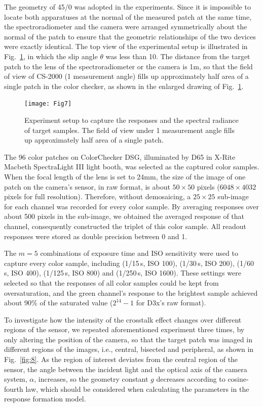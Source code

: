 \documentclass[9pt,twocolumn,twoside]{osajnl}
\begin{document}
The geometry of 45\textdegree{}/0\textdegree{} was adopted in the experiments. Since it is impossible to locate both apparatuses at the normal of the measured patch at the same time, the spectroradiometer and the camera were arranged symmetrically about the normal of the patch to ensure that the geometric relationships of the two devices were exactly identical. The top view of the experimental setup is illustrated in Fig.~\ref{fig:7}, in which the slip angle $\theta$ was less than 10\textdegree. The distance from the target patch to the lens of the spectroradiometer or the camera is 1m, so that the field of view of CS-2000 (1\textdegree{} measurement angle) fills up approximately half area of a single patch in the color checker, as shown in the enlarged drawing of Fig.~\ref{fig:7}. 

\begin{figure}[tbp]
	\centering
	\texttt{[image: Fig7]}
	\caption{Experiment setup to capture the responses and the spectral radiance of target samples. The field of view under 1\textdegree{} measurement angle fills up approximately half area of a single patch.}
	\label{fig:7}
\end{figure}

The 96 color patches on ColorChecker DSG, illuminated by D65 in X-Rite Macbeth SpectraLight III light booth, was selected as the captured color samples. When the focal length of the lens is set to 24mm, the size of the image of one patch on the camera’s sensor, in raw format, is about $50\times50$ pixels ($6048\times4032$ pixels for full resolution). Therefore, without demosaicing, a $25\times25$ sub-image for each channel was recorded for every color sample. By averaging responses over about 500 pixels in the sub-image, we obtained the averaged response of that channel, consequently constructed the triplet of this color sample. All readout responses were stored as double precision between 0 and 1.

The $m=5$ combinations of exposure time and ISO sensitivity were used to capture every color sample, including (1/15\,s, ISO 100), (1/30\,s, ISO 200), (1/60\,s, ISO 400), (1/125\,s, ISO 800) and (1/250\,s, ISO 1600). These settings were selected so that the responses of all color samples could be kept from oversaturation, and the green channel’s response to the brightest sample achieved about 90\% of the saturated value ($2^{14}-1$ for D3x’s raw format).

To investigate how the intensity of the crosstalk effect changes over different regions of the sensor, we repeated aforementioned experiment three times, by only altering the position of the camera, so that the target patch was imaged in different regions of the images, i.e., central, bisected and peripheral, as shown in Fig.~\ref{fig:8}. As the region of interest deviates from the central region of the sensor, the angle between the incident light and the optical axis of the camera system, $\alpha$, increases, so the geometry constant $g$ decreases according to cosine-fourth law, which should be considered when calculating the parameters in the response formation model.
\end{document}

